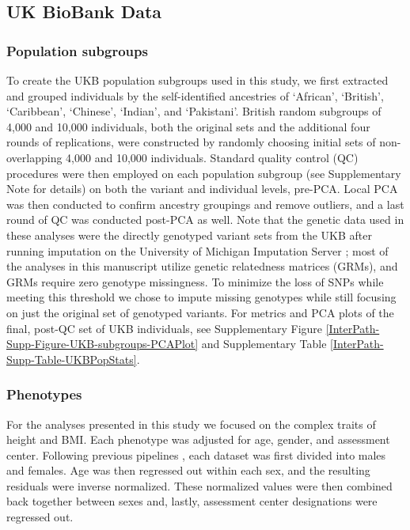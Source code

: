 \documentclass[12pt,a4paper]{article}
\begin{document}
\subsection{UK BioBank Data}

\subsubsection{Population subgroups}

To create the UKB population subgroups used in this study, we first extracted and grouped individuals by the self-identified ancestries of `African', `British', `Caribbean', `Chinese', `Indian', and `Pakistani'. British random subgroups of 4,000 and 10,000 individuals, both the original sets and the additional four rounds of replications, were constructed by randomly choosing initial sets of non-overlapping 4,000 and 10,000 individuals. Standard quality control (QC) procedures were then employed on each population subgroup (see Supplementary Note for details) on both the variant and individual levels, pre-PCA. Local PCA was then conducted to confirm ancestry groupings and remove outliers, and a last round of QC was conducted post-PCA as well. Note that the genetic data used in these analyses were the directly genotyped variant sets  from the UKB after running imputation on the University of Michigan Imputation Server \citep{Das2016}; most of the analyses in this manuscript utilize genetic relatedness matrices (GRMs), and GRMs require zero genotype missingness. To minimize the loss of SNPs while meeting this threshold we chose to impute missing genotypes while still focusing on just the original set of genotyped variants. For metrics and PCA plots of the final, post-QC set of UKB individuals, see Supplementary Figure \ref{InterPath-Supp-Figure-UKB-subgroups-PCAPlot} and Supplementary Table \ref{InterPath-Supp-Table-UKBPopStats}. 

\subsubsection{Phenotypes}

For the analyses presented in this study we focused on the complex traits of height and BMI. Each phenotype was adjusted for age, gender, and assessment center. Following previous pipelines \citep{Wood2014,Locke2015}, each dataset was first divided into males and females. Age was then regressed out within each sex, and the resulting residuals were inverse normalized. These normalized values were then combined back together between sexes and, lastly, assessment center designations were regressed out. 
\end{document}
